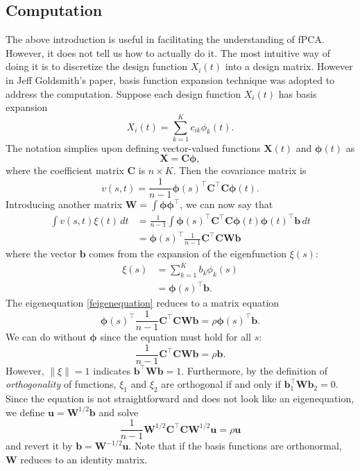 \documentclass[11pt]{article}
\newcommand{\bs}{\boldsymbol}
\begin{document}
\subsection{Computation}
The above introduction is useful in facilitating the understanding of fPCA. However, it does not tell us how to actually do it. The most intuitive way of doing it is to discretize the design function $X_{i}\left(t\right)$ into a design matrix. However in Jeff Goldsmith's paper, basis function expansion technique was adopted to address the computation. Suppose each design function $X_{i}\left(t\right)$ has basis expansion
\begin{equation}
  X_{i}\left(t\right) = \sum_{k=1}^{K}c_{ik}\phi_{k}\left(t\right).
\end{equation}
The notation simplies upon defining vector-valued functions $\bs{X}\left(t\right)$ and $\bs{\phi}\left(t\right)$ as
\begin{equation}
  \bs{X}=\bs{C\phi},
\end{equation}
where the coefficient matrix $\bs{C}$ is $n \times K$. Then the covariance matrix is
\begin{equation}
  v\left(s,t\right) = \frac{1}{n-1}\bs{\phi}\left(s\right)^{\top}\bs{C}^{\top}\bs{C\phi}\left(t\right).
\end{equation}
Introducing another matrix $\bs{W}=\int \bs{\phi}\bs{\phi}^{\top}$, we can now say that
\begin{align}
  \int v\left(s,t\right)\xi\left(t\right)\,dt &= \frac{1}{n-1}\int \bs{\phi}\left(s\right)^{\top}\bs{C}^{\top}\bs{C}\bs{\phi}\left(t\right)\bs{\phi}\left(t\right)^{\top}\bs{b}\,dt\\
  &= \bs{\phi}\left(s\right)^{\top}\frac{1}{n-1}\bs{C}^{\top}\bs{CWb}
\end{align}
where the vector $\bs{b}$ comes from the expansion of the eigenfunction $\xi\left(s\right)$:
\begin{align}
  \xi\left(s\right) &= \sum_{k=1}^{K}b_{k}\phi_{k}\left(s\right)\\
  &= \bs{\phi}\left(s\right)^{\top}\bs{b}.
\end{align}
The eigenequation \ref{feigenequation} reduces to a matrix equation
\begin{equation}
  \bs{\phi}\left(s\right)^{\top}\frac{1}{n-1}\bs{C}^{\top}\bs{CWb} = \rho \bs{\phi}\left(s\right)^{\top}\bs{b}.
\end{equation}
We can do without $\bs{\phi}$ since the equation must hold for all $s$:
\begin{equation}
  \frac{1}{n-1}\bs{C}^{\top}\bs{CWb} =\rho \bs{b}.
\end{equation}
However, $\left\| \xi \right\| =1$ indicates $\bs{b}^{\top}\bs{Wb} = 1$. Furthermore, by the definition of \emph{orthogonality} of functions, $\xi_{1}$ and $\xi_{2}$ are orthogonal if and only if $\bs{b}_{1}^{\top}\bs{Wb}_{2} = 0$. Since the equation is not straightforward and does not look like an eigenequation, we define $\bs{u} = \bs{W}^{1/2}\bs{b}$ and solve
\begin{equation}
  \frac{1}{n-1}\bs{W}^{1/2}\bs{C}^{\top}\bs{CW}^{1/2}\bs{u} = \rho \bs{u}
\end{equation}
and revert it by $\bs{b}=\bs{W}^{-1/2}\bs{u}$. Note that if the basis functions are orthonormal, $\bs{W}$ reduces to an identity matrix.
\end{document}
